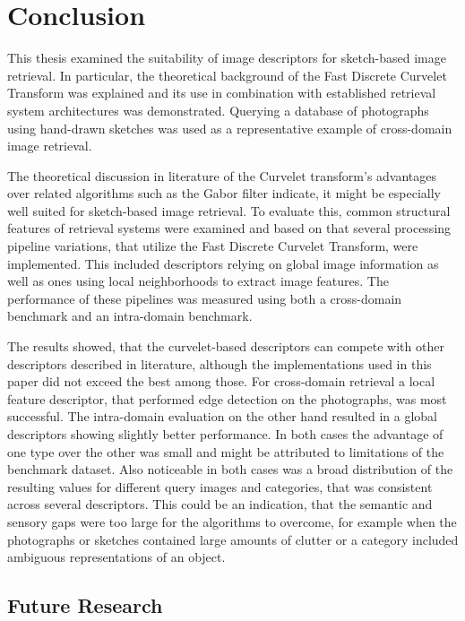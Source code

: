 \chapter{Conclusion}\label{ch:conclusion}

This thesis examined the suitability of image descriptors for sketch-based
image retrieval. In particular, the theoretical background of the Fast Discrete
Curvelet Transform was explained and its use in combination with established
retrieval system architectures was demonstrated. Querying a database of
photographs using hand-drawn sketches was used as a representative example of
cross-domain image retrieval.

The theoretical discussion in literature of the Curvelet transform's advantages
over related algorithms such as the Gabor filter indicate, it might be
especially well suited for sketch-based image retrieval. To evaluate this,
common structural features of retrieval systems were examined and based on that
several processing pipeline variations, that utilize the Fast Discrete Curvelet
Transform, were implemented. This included descriptors relying on global image
information as well as ones using local neighborhoods to extract image
features. The performance of these pipelines was measured using both a
cross-domain benchmark and an intra-domain benchmark.

The results showed, that the curvelet-based descriptors can compete with other
descriptors described in literature, although the implementations used in this
paper did not exceed the best among those. For cross-domain retrieval a local
feature descriptor, that performed edge detection on the photographs, was most
successful. The intra-domain evaluation on the other hand resulted in a global
descriptors showing slightly better performance. In both cases the advantage of
one type over the other was small and might be attributed to limitations of the
benchmark dataset. Also noticeable in both cases was a broad distribution of
the resulting values for different query images and categories, that was
consistent across several descriptors. This could be an indication, that the
semantic and sensory gaps were too large for the algorithms to overcome, for
example when the photographs or sketches contained large amounts of clutter or
a category included ambiguous representations of an object.

\section{Future Research}\label{sec:conclusion_future_research}

